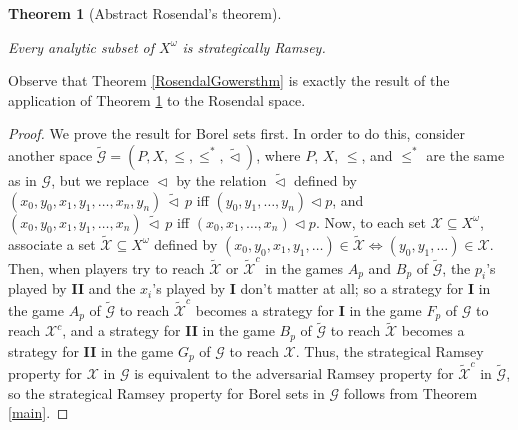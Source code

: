 \documentclass[a4paper,11pt]{article}
\newtheorem{thm}{Theorem}[section]
\theoremstyle{definition}
\numberwithin{equation}{section}
\newcommand{\X}{\mathcal{X}}
\newcommand{\G}{\mathcal{G}}
\newcommand{\I}{\textbf{I}}
\newcommand{\II}{\textbf{II}}
\begin{document}
\begin{thm}[Abstract Rosendal's theorem]\label{abstractRosendal}

Every analytic subset of $X^\omega$ is strategically Ramsey.

\end{thm}

Observe that Theorem \ref{RosendalGowersthm} is exactly the result of the application of Theorem \ref{abstractRosendal} to the Rosendal space.

\begin{proof}

We prove the result for Borel sets first. In order to do this, consider another space $\widetilde{\G} = (P, X, \leqslant, \leqslant^*, \widetilde{\vartriangleleft})$, where $P$, $X$, $\leqslant$, and $\leqslant^*$ are the same as in $\G$, but we replace $\vartriangleleft$ by the relation $\widetilde{\vartriangleleft}$ defined by $(x_0, y_0, x_1, y_1, \ldots, x_n, y_n) \, {\widetilde{\vartriangleleft}} \, p$ iff $(y_0, y_1, \ldots, y_n) \vartriangleleft p$, and $(x_0, y_0, x_1, y_1, \ldots, x_n) \, {\widetilde{\vartriangleleft}} \, p$ iff $(x_0, x_1, \ldots, x_n) \vartriangleleft p$. Now, to each set $\X \subseteq X^\omega$, associate a set $\widetilde{\X} \subseteq X^\omega$ defined by $(x_0, y_0, x_1, y_1, \ldots) \in \widetilde{\X} \Leftrightarrow (y_0, y_1, \ldots) \in \X$. Then, when players try to reach $\widetilde{\X}$ or $\widetilde{\X}^c$ in the games $A_p$ and $B_p$ of $\widetilde{\G}$, the $p_i$'s played by \II{} and the $x_i$'s played by \I{} don't matter at all; so a strategy for \I{} in the game $A_p$ of $\widetilde{\G}$ to reach $\widetilde{\X}^c$ becomes a strategy for \I{} in the game $F_p$ of $\G$ to reach $\X^c$, and a strategy for \II{} in the game $B_p$ of $\widetilde{\G}$ to reach $\widetilde{\X}$ becomes a strategy for \II{} in the game $G_p$ of $\G$ to reach $\X$. Thus, the strategical Ramsey property for $\X$ in $\G$ is equivalent to the adversarial Ramsey property for $\widetilde{\X}^c$ in $\widetilde{\G}$, so the strategical Ramsey property for Borel sets in $\G$ follows from Theorem \ref{main}.

\smallskip


\end{proof}
\end{document}
